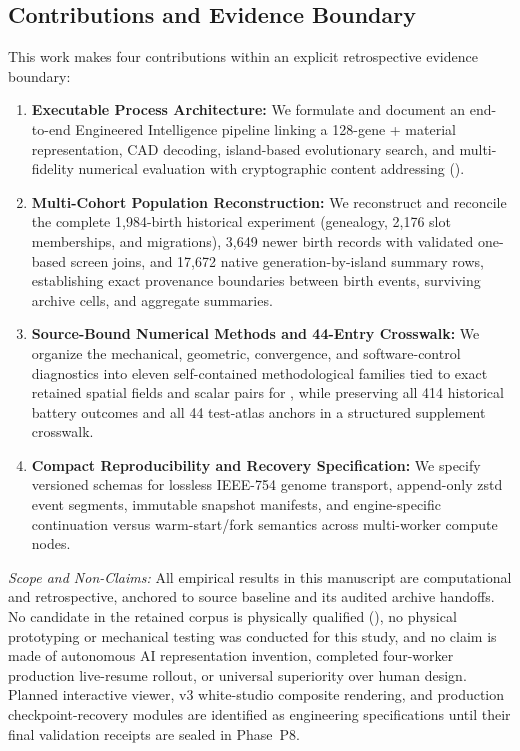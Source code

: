 \subsection{Contributions and Evidence Boundary}
\label{subsec:contributions}
This work makes four contributions within an explicit retrospective evidence boundary:
\begin{enumerate}
  \item \textbf{Executable Process Architecture:} We formulate and document an end-to-end Engineered Intelligence pipeline linking a 128-gene + material representation, CAD decoding, island-based evolutionary search, and multi-fidelity numerical evaluation with cryptographic content addressing ().
  \item \textbf{Multi-Cohort Population Reconstruction:} We reconstruct and reconcile the complete 1,984-birth historical experiment (genealogy, 2,176 slot memberships, and migrations), 3,649 newer birth records with validated one-based screen joins, and 17,672 native generation-by-island summary rows, establishing exact provenance boundaries between birth events, surviving archive cells, and aggregate summaries.
  \item \textbf{Source-Bound Numerical Methods and 44-Entry Crosswalk:} We organize the mechanical, geometric, convergence, and software-control diagnostics into eleven self-contained methodological families tied to exact retained spatial fields and scalar pairs for , while preserving all 414 historical battery outcomes and all 44 test-atlas anchors in a structured supplement crosswalk.
  \item \textbf{Compact Reproducibility and Recovery Specification:} We specify versioned schemas for lossless IEEE-754 genome transport, append-only zstd event segments, immutable snapshot manifests, and engine-specific continuation versus warm-start/fork semantics across multi-worker compute nodes.
\end{enumerate}

\emph{Scope and Non-Claims:} All empirical results in this manuscript are computational and retrospective, anchored to source baseline  and its audited archive handoffs. No candidate in the retained corpus is physically qualified (), no physical prototyping or mechanical testing was conducted for this study, and no claim is made of autonomous AI representation invention, completed four-worker production live-resume rollout, or universal superiority over human design. Planned interactive viewer, v3 white-studio composite rendering, and production checkpoint-recovery modules are identified as engineering specifications until their final validation receipts are sealed in Phase~P8.
